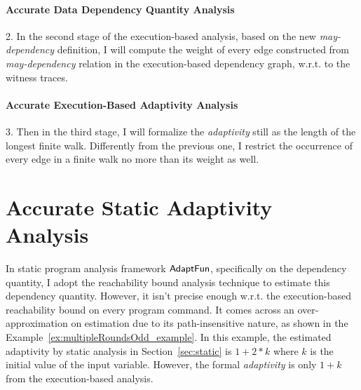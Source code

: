\paragraph{Accurate Data Dependency Quantity Analysis}
\label{subsec:refine-exe-reachability}
2. In the second stage of the execution-based analysis, 
based on the new \emph{may-dependency} definition,
I will compute the weight of every edge constructed from 
\emph{may-dependency} relation in the execution-based dependency graph, w.r.t. to the witness traces.
%
\paragraph{Accurate Execution-Based Adaptivity Analysis}
\label{subsec:refine-exe-adapt}
%
3. Then in the third stage, I will formalize the \emph{adaptivity} still as the 
length of the longest finite walk. Differently from the previous one, I restrict 
the occurrence of every edge in a finite walk no more than its weight as well.
%

\section{Accurate Static Adaptivity Analysis}
\label{sec:refine-static}

% 

In static program analysis framework $\textsf{AdaptFun}$, specifically on the dependency quantity, 
I adopt the reachability bound analysis technique to estimate this dependency quantity.
However, it isn't precise enough w.r.t. the execution-based reachability bound on every program command.
It comes across an over-approximation on estimation due to its path-insensitive nature,
as shown in the Example~\ref{ex:multipleRoundsOdd_example}.
In this example, the estimated adaptivity by static analysis in Section~\ref{sec:static} 
is $1 + 2*k$ where $k$ is the initial value of the input variable.
However, the formal \emph{adaptivity} is only $1 + k$ from the execution-based analysis.

